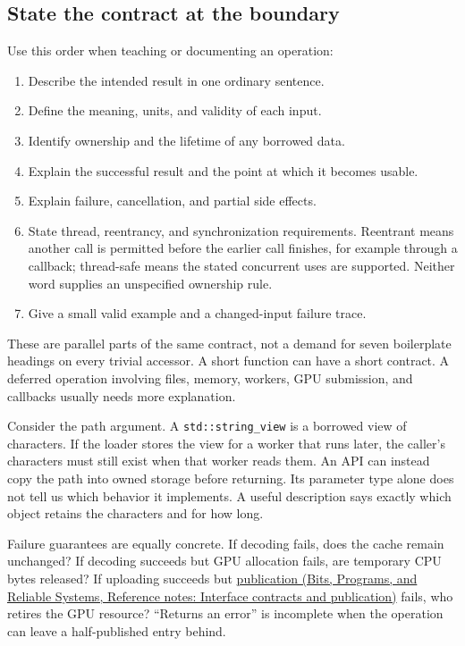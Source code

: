 \subsection{State the contract at the boundary}\label{01-foundations-i-ch008-state-the-contract-at-the-boundary}

Use this order when teaching or documenting an operation:

\begin{enumerate}
\def\labelenumi{\arabic{enumi}.}
\tightlist
\item
  Describe the intended result in one ordinary sentence.
\item
  Define the meaning, units, and validity of each input.
\item
  Identify ownership and the lifetime of any borrowed data.
\item
  Explain the successful result and the point at which it becomes usable.
\item
  Explain failure, cancellation, and partial side effects.
\item
  State thread, reentrancy, and synchronization requirements. Reentrant means another call is permitted before the earlier call finishes, for example through a callback; thread-safe means the stated concurrent uses are supported. Neither word supplies an unspecified ownership rule.
\item
  Give a small valid example and a changed-input failure trace.
\end{enumerate}

These are parallel parts of the same contract, not a demand for seven boilerplate headings on every trivial accessor. A short function can have a short contract. A deferred operation involving files, memory, workers, GPU submission, and callbacks usually needs more explanation.

Consider the path argument. A \texttt{std::string\_view} is a borrowed view of characters. If the loader stores the view for a worker that runs later, the caller's characters must still exist when that worker reads them. An API can instead copy the path into owned storage before returning. Its parameter type alone does not tell us which behavior it implements. A useful description says exactly which object retains the characters and for how long.

Failure guarantees are equally concrete. If decoding fails, does the cache remain unchanged? If decoding succeeds but GPU allocation fails, are temporary CPU bytes released? If uploading succeeds but \href{../01-Bits-Programs-and-Reliable-Systems/main.pdf\#nameddest=appendix-fdae7ff0a23f}{publication (Bits, Programs, and Reliable Systems, Reference notes: Interface contracts and publication)} fails, who retires the GPU resource? ``Returns an error'' is incomplete when the operation can leave a half-published entry behind.

